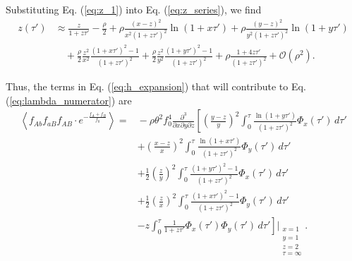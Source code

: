 \documentclass[11pt]{article}
\begin{document}
Substituting Eq. (\ref{eq:z_1}) into Eq. (\ref{eq:z_series}), we find
\begin{align}
    z(\tau') &\approx \frac{z}{1+z\tau'} 
    - \frac{\rho}{2}
    + \rho\frac{(x-z)^2}{x^2(1+z\tau')^2}\ln(1+x\tau')
    + \rho\frac{(y-z)^2}{y^2(1+z\tau')^2}\ln(1+y\tau') \\\nonumber
    &\quad + \frac{\rho}{2}\frac{z^2}{x^2}\frac{(1+x\tau')^2-1}{(1+z\tau')^2}
    + \frac{\rho}{2}\frac{z^2}{y^2}\frac{(1+y\tau')^2-1}{(1+z\tau')^2}
    + \rho\frac{1+4z\tau'}{(1+z\tau')^2} + \mathcal{O}(\rho^2).
\end{align}

Thus, the terms in Eq. (\ref{eq:h_expansion}) that will contribute to Eq. (\ref{eq:lambda_numerator}) are 
\begin{align}
    \left\langle f_{Ab}f_{aB}f_{AB}\cdot e^{-\frac{f_{A}+f_{B}}{f_0}}\right\rangle =&{} -\rho \theta^2 f_0^4 \frac{\partial^3}{\partial x \partial y \partial z} \left[ \left(\frac{y-z}{y}\right)^2 \int_0^{\tau} \frac{\ln(1+y\tau')}{(1+z\tau')^2} \Phi_x(\tau') \,d\tau' \right. \\\nonumber
    &+ \left. \left(\frac{x-z}{x}\right)^2 \int_0^{\tau} \frac{\ln(1+x\tau')}{(1+z\tau')^2} \Phi_y(\tau') \,d\tau' \right. \\\nonumber
    &+ \left. \frac{1}{2} \left(\frac{z}{y}\right)^2 \int_0^{\tau}  \frac{(1+y\tau')^2-1}{(1+z\tau')^2}\Phi_x(\tau') \,d\tau' \right. \\\nonumber
    &+ \left. \frac{1}{2} \left(\frac{z}{x}\right)^2 \int_0^{\tau} \frac{(1+x\tau')^2-1}{(1+z\tau')^2}\Phi_y(\tau') \,d\tau' \right. \\\nonumber
    &- \left.  z\int_0^{\tau} \frac{1}{1+z\tau'} \Phi_x(\tau')\Phi_y(\tau') \,d\tau'\right]\Bigg\vert_{\substack{x=1 \\ y=1 \\ z=2 \\ \tau=\infty}}.

\end{align}
\end{document}
